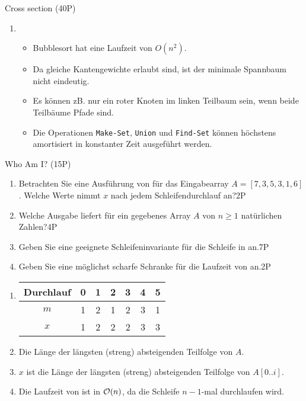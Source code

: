 \documentclass{article}
\begin{document}
\begin{exercise}{Cross section (40P)}
\begin{solution}
\begin{enumerate}
\begin{itemize}
            \end{itemize}
      \item \begin{itemize}
              \item[\xmark] Bubblesort hat eine Laufzeit von $O(n^2)$.
              \item[\xmark] Da gleiche Kantengewichte erlaubt sind, ist der minimale Spannbaum nicht eindeutig.
              \item[\xmark] Es können zB. nur ein roter Knoten im linken Teilbaum sein, wenn beide Teilbäume Pfade sind.
              \item[\xmark] Die Operationen \texttt{Make-Set}, \texttt{Union} und \texttt{Find-Set} können höchstens amortisiert in konstanter Zeit ausgeführt werden.
            \end{itemize}
    \end{enumerate}
  \end{solution}
\end{exercise}

\begin{exercise}{Who Am I? (15P)}
  
  \begin{enumerate}
    \item Betrachten Sie eine Ausführung von  für das Eingabearray $A = [7,3,5,3,1,6]$. Welche Werte nimmt $x$ nach jedem Schleifendurchlauf an?\hfill 2P
    \item Welche Ausgabe liefert  für ein gegebenes Array $A$ von $n \geq 1$ natürlichen Zahlen?\hfill 4P
    \item Geben Sie eine geeignete Schleifeninvariante für die Schleife in  an.\hfill 7P
    \item Geben Sie eine möglichst scharfe Schranke für die Laufzeit von  an.\hfill 2P
  \end{enumerate}
  \begin{solution}
    \begin{enumerate}
      \item \begin{tabular}{c|cccccc}
              Durchlauf & 0 & 1 & 2 & 3 & 4 & 5 \\
              \hline
              $m$       & 1 & 2 & 1 & 2 & 3 & 1 \\
              $x$       & 1 & 2 & 2 & 2 & 3 & 3
            \end{tabular}
      \item Die Länge der längsten (streng) absteigenden Teilfolge von $A$.
      \item $x$ ist die Länge der längsten (streng) absteigenden Teilfolge von $A[0..i]$.
      \item Die Laufzeit von  ist in $\mathcal{O}(n)$, da die Schleife $n-1$-mal durchlaufen wird.
    \end{enumerate}
  \end{solution}
\end{exercise}
\end{document}
